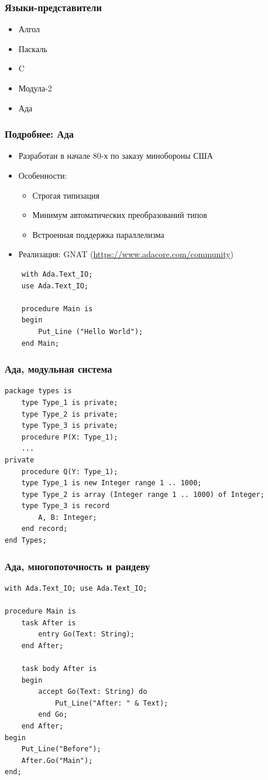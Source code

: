 \documentclass[xetex,mathserif,serif]{beamer}
\begin{document}
	\begin{frame}
		\frametitle{Языки-представители}
		\begin{itemize}
			\item Алгол
			\item Паскаль
			\item C
			\item Модула-2
			\item Ада
		\end{itemize}
	\end{frame}

	\begin{frame}[fragile]
		\frametitle{Подробнее: Ада}
		\begin{itemize}
			\item Разработан в начале 80-х по заказу минобороны США
			\item Особенности:
			\begin{itemize}
				\item Строгая типизация
				\item Минимум автоматических преобразований типов
				\item Встроенная поддержка параллелизма
			\end{itemize}
			\item Реализация: GNAT (\url{https://www.adacore.com/community})
		\end{itemize}
		\begin{verbatim}
    with Ada.Text_IO;
    use Ada.Text_IO;

    procedure Main is
    begin
        Put_Line ("Hello World");
    end Main;
		\end{verbatim}
	\end{frame}

	\begin{frame}[fragile]
		\frametitle{Ада, модульная система}
		\begin{verbatim}
package types is
    type Type_1 is private;
    type Type_2 is private;
    type Type_3 is private;
    procedure P(X: Type_1);
    ...
private
    procedure Q(Y: Type_1);
    type Type_1 is new Integer range 1 .. 1000;
    type Type_2 is array (Integer range 1 .. 1000) of Integer;
    type Type_3 is record
        A, B: Integer;
    end record;
end Types;
		\end{verbatim}
	\end{frame}

	\begin{frame}[fragile]
		\frametitle{Ада, многопоточность и рандеву}
		\begin{small}
			\begin{verbatim}
with Ada.Text_IO; use Ada.Text_IO;

procedure Main is
    task After is
        entry Go(Text: String);
    end After;

    task body After is
    begin
        accept Go(Text: String) do
            Put_Line("After: " & Text);
        end Go;
    end After;
begin
    Put_Line("Before");
    After.Go("Main");
end;
			\end{verbatim}
		\end{small}
	\end{frame}
\end{document}
